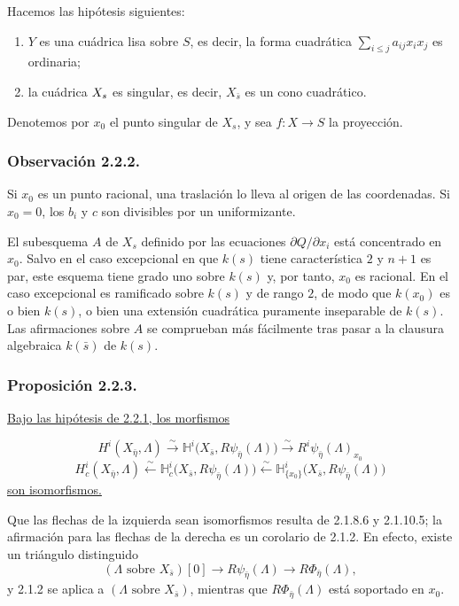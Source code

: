 Hacemos las hipótesis siguientes:

\begin{enumerate}
\item[(a)] $Y$ es una cuádrica lisa sobre $S$, es decir, la forma
cuadrática $\sum_{i\leq j}a_{ij}x_ix_j$ es ordinaria;

\item[(b)] la cuádrica $\sisi{X'_s}{X_s}$ es singular, es decir,
$X_{\bar s}$ es un cono cuadrático.
\end{enumerate}

Denotemos por $x_0$ el punto singular de $X_s$, y sea $f:X\to S$ la
proyección.

\subsubsection*{Observación 2.2.2.}
Si $x_0$ es un punto racional, una traslación lo lleva al origen de las
coordenadas. Si $x_0=0$, los $b_i$ y $c$ son divisibles por un
uniformizante.

El subesquema $A$ de $X_s$ definido por las ecuaciones
$\partial Q/\partial x_i$ está concentrado en $x_0$. Salvo en el caso
excepcional en que $k(s)$ tiene característica $2$ y $n+1$ es par, este
esquema tiene grado uno sobre $k(s)$ y, por tanto, $x_0$ es racional.
En el caso excepcional es ramificado sobre $k(s)$ y de rango $2$, de
modo que $k(x_0)$ es o bien $k(s)$, o bien una extensión cuadrática
puramente inseparable de $k(s)$. Las afirmaciones sobre $A$ se comprueban
más fácilmente tras pasar a la clausura algebraica $k(\bar s)$ de
$k(s)$.

\subsubsection*{Proposición 2.2.3.}
\underline{Bajo las hipótesis de 2.2.1, los morfismos}

\pageoriginale

\[
H^i(X_{\bar\eta},\Lambda)
 \xrightarrow{\ \sim\ }
\mathbb H^i\bigl(X_{\bar s},R\psi_{\bar\eta}(\Lambda)\bigr)
 \xrightarrow{\ \sim\ }
R^i\psi_{\bar\eta}(\Lambda)_{x_0}
\]
\[
H_c^i(X_{\bar\eta},\Lambda)
 \xleftarrow{\ \sim\ }
\mathbb H_c^i\bigl(X_{\bar s},R\psi_{\bar\eta}(\Lambda)\bigr)
 \xleftarrow{\ \sim\ }
\mathbb H^i_{\{x_0\}}\bigl(X_{\bar s},R\psi_{\bar\eta}(\Lambda)\bigr)
\]
\underline{son isomorfismos.}

Que las flechas de la izquierda sean isomorfismos resulta de 2.1.8.6
y 2.1.10.5; la afirmación para las flechas de la derecha es un
corolario de 2.1.2. En efecto, existe un triángulo distinguido
\[
(\Lambda\text{ sobre }X_{\bar s})[0]
 \longrightarrow R\psi_{\bar\eta}(\Lambda)
 \longrightarrow R\Phi_{\bar\eta}(\Lambda),
\]
y 2.1.2 se aplica a $(\Lambda\text{ sobre }X_{\bar s})$, mientras que
$R\Phi_{\bar\eta}(\Lambda)$ está soportado en $x_0$.

